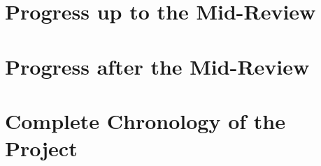\documentclass[11pt,a4paper]{article}
\begin{document}
\begin{abstract}
\textbf{Part III: the whole project in time order}, including what failed: the full-system setup, a \texttt{gem5} device panic that stopped all runs, a page walker write that broke the cache code, a 12 GiB memory map, and an x87 bug in \texttt{gem5} that made perlbench fail (an unimplemented \texttt{fcomip}, and register moves that copied only 32 of 64 bits).

The appendix describes the submitted artifact and how to test it.
\end{abstract}

\newpage
\tableofcontents
\newpage

\part{Progress up to the Mid-Review}
\label{part:mid}


\newpage
\part{Progress after the Mid-Review}
\label{part:post}


\newpage
\part{Complete Chronology of the Project}
\label{part:chron}


\newpage
\begin{appendices}

\end{appendices}
\end{document}
